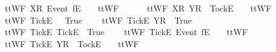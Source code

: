 \begin{isabellebody}
\ \ {\isachardoublequoteopen}ttWF{}\ {\isacharbrackleft}{\isacharbrackleft}X{\isacharbrackright}\isactrlsub R{\isacharbrackright}\ {\isacharparenleft}{\isacharbrackleft}Event\ f{\isacharbrackright}\isactrlsub E\ {\isacharhash}\ {\isasymsigma}{\isacharparenright}\ {\isacharequal}\ ttWF{}\ {\isacharbrackleft}{\isacharbrackright}\ {\isasymsigma}{\isachardoublequoteclose}\ {\isacharbar}\ \isanewline
\ \ {\isachardoublequoteopen}ttWF{}\ {\isacharbrackleft}{\isacharbrackleft}X{\isacharbrackright}\isactrlsub R{\isacharbrackright}\ {\isacharparenleft}{\isacharbrackleft}Y{\isacharbrackright}\isactrlsub R\ {\isacharhash}\ {\isacharbrackleft}Tock{\isacharbrackright}\isactrlsub E\ {\isacharhash}\ {\isasymsigma}{\isacharparenright}\ {\isacharequal}\ ttWF{}\ {\isacharbrackleft}{\isacharbrackright}\ {\isasymsigma}{\isachardoublequoteclose}\ {\isacharbar}\ \isanewline
\ \ {\isachardoublequoteopen}ttWF{}\ {\isacharbrackleft}{\isacharbrackleft}Tick{\isacharbrackright}\isactrlsub E{\isacharbrackright}\ {\isacharbrackleft}{\isacharbrackright}\ {\isacharequal}\ True{\isachardoublequoteclose}\ {\isacharbar}\ \isanewline
\ \ {\isachardoublequoteopen}ttWF{}\ {\isacharbrackleft}{\isacharbrackleft}Tick{\isacharbrackright}\isactrlsub E{\isacharbrackright}\ {\isacharbrackleft}{\isacharbrackleft}Y{\isacharbrackright}\isactrlsub R{\isacharbrackright}\ {\isacharequal}\ True{\isachardoublequoteclose}\ {\isacharbar}\ \isanewline
\ \ {\isachardoublequoteopen}ttWF{}\ {\isacharbrackleft}{\isacharbrackleft}Tick{\isacharbrackright}\isactrlsub E{\isacharbrackright}\ {\isacharbrackleft}{\isacharbrackleft}Tick{\isacharbrackright}\isactrlsub E{\isacharbrackright}\ {\isacharequal}\ True{\isachardoublequoteclose}\ {\isacharbar}\ \isanewline
\ \ {\isachardoublequoteopen}ttWF{}\ {\isacharbrackleft}{\isacharbrackleft}Tick{\isacharbrackright}\isactrlsub E{\isacharbrackright}\ {\isacharparenleft}{\isacharbrackleft}Event\ f{\isacharbrackright}\isactrlsub E\ {\isacharhash}\ {\isasymsigma}{\isacharparenright}\ {\isacharequal}\ ttWF{}\ {\isacharbrackleft}{\isacharbrackright}\ {\isasymsigma}{\isachardoublequoteclose}\ {\isacharbar}\ \isanewline
\ \ {\isachardoublequoteopen}ttWF{}\ {\isacharbrackleft}{\isacharbrackleft}Tick{\isacharbrackright}\isactrlsub E{\isacharbrackright}\ {\isacharparenleft}{\isacharbrackleft}Y{\isacharbrackright}\isactrlsub R\ {\isacharhash}\ {\isacharbrackleft}Tock{\isacharbrackright}\isactrlsub E\ {\isacharhash}\ {\isasymsigma}{\isacharparenright}\ {\isacharequal}\ ttWF{}\ {\isacharbrackleft}{\isacharbrackright}\ {\isasymsigma}{\isachardoublequoteclose}\ {\isacharbar}\ \isanewline

\end{isabellebody}
